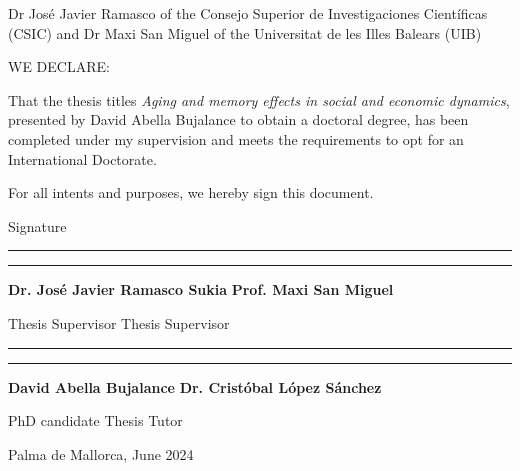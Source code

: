 Dr Jos\'e Javier Ramasco of the Consejo Superior de Investigaciones Cient\'ificas (CSIC) and Dr Maxi San Miguel of the Universitat de les Illes Balears (UIB)

\vspace*{2 cm}

WE DECLARE:

\vspace*{1 cm}

That the thesis titles \textit{Aging and memory effects in social and economic dynamics}, presented by David Abella Bujalance to obtain a doctoral degree, has been completed under my supervision and meets the requirements to opt for an International Doctorate.

\vspace*{1 cm}

For all intents and purposes, we hereby sign this document.

\vspace*{1 cm}

Signature

\vspace*{3.5 cm}

\rule{5.5cm}{0.4pt} \hfill \noindent\rule{5.5cm}{0.4pt}

\vspace*{0.1 cm}

      \textbf{Dr. Jos\'e Javier Ramasco Sukia}              \hfill  \textbf{Prof. Maxi San Miguel}


\vspace*{0.1 cm}

        Thesis Supervisor              \hfill Thesis Supervisor

\vspace*{3.5 cm}

\rule{5.5cm}{0.4pt} \hfill \noindent\rule{5.5cm}{0.4pt}

\vspace*{0.1 cm}

\textbf{David Abella Bujalance}              \hfill  \textbf{Dr. Cristóbal López Sánchez}


\vspace*{0.1 cm}

        PhD candidate              \hfill    Thesis Tutor

\vspace*{1 cm}

        Palma de Mallorca, June 2024

\vfill